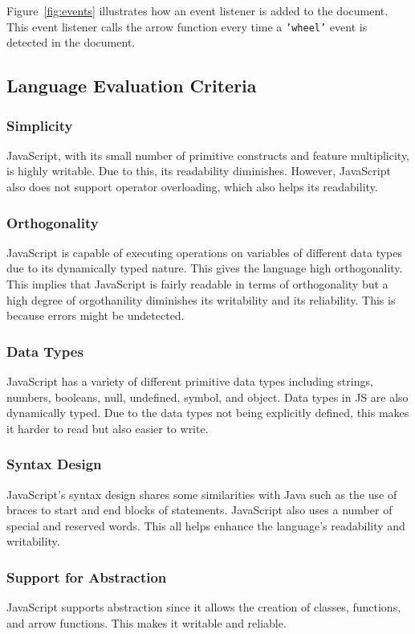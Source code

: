 \documentclass{article}
\newcommand{\jsin}[1]{\texttt{#1}}
\begin{document}
  Figure~\ref{fig:events} illustrates how an event listener is added to the
  document. This event listener calls the arrow function every time a
  \jsin{'wheel'} event is detected in the document.


  \subsection{Language Evaluation Criteria}

  \subsubsection{Simplicity}
  JavaScript, with its small number of primitive constructs and feature
  multiplicity, is highly writable. Due to this, its readability diminishes.
  However, JavaScript also does not support operator overloading, which also
  helps its readability.

  \subsubsection{Orthogonality}
  JavaScript is capable of executing operations on variables of different data
  types due to its dynamically typed nature. This gives the language high
  orthogonality. This implies that JavaScript is fairly readable in terms of
  orthogonality but a high degree of orgothanility diminishes its writability
  and its reliability. This is because errors might be undetected.


  \subsubsection{Data Types}
  JavaScript has a variety of different primitive data types including strings,
  numbers, booleans, null, undefined, symbol, and object. Data types in JS are
  also dynamically typed. Due to the data types not being explicitly defined,
  this makes it harder to read but also easier to write.

  \subsubsection{Syntax Design}
  JavaScript’s syntax design shares some similarities with Java such as the use
  of braces to start and end blocks of statements. JavaScript also uses a number
  of special and reserved words. This all helps enhance the language’s
  readability and writability.

  \subsubsection{Support for Abstraction}
  JavaScript supports abstraction since it allows the creation of classes,
  functions, and arrow functions. This makes it writable and reliable.
\end{document}
